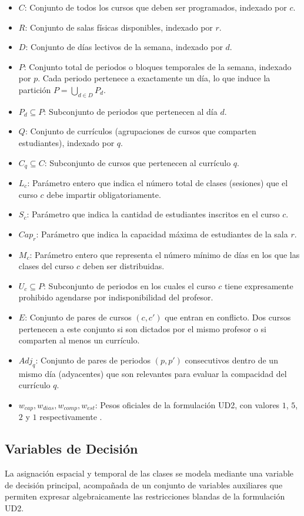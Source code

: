 \documentclass[letter, 10pt]{article}
\begin{document}
\begin{itemize}
    \item $C$: Conjunto de todos los cursos que deben ser programados, indexado por $c$.
    \item $R$: Conjunto de salas físicas disponibles, indexado por $r$.
    \item $D$: Conjunto de días lectivos de la semana, indexado por $d$.
    \item $P$: Conjunto total de periodos o bloques temporales de la semana, indexado por $p$. Cada periodo pertenece a exactamente un día, lo que induce la partición $P = \bigcup_{d \in D} P_d$.
    \item $P_d \subseteq P$: Subconjunto de periodos que pertenecen al día $d$.
    \item $Q$: Conjunto de currículos (agrupaciones de cursos que comparten estudiantes), indexado por $q$.
    \item $C_q \subseteq C$: Subconjunto de cursos que pertenecen al currículo $q$.
    \item $L_c$: Parámetro entero que indica el número total de clases (sesiones) que el curso $c$ debe impartir obligatoriamente.
    \item $S_c$: Parámetro que indica la cantidad de estudiantes inscritos en el curso $c$.
    \item $Cap_r$: Parámetro que indica la capacidad máxima de estudiantes de la sala $r$.
    \item $M_c$: Parámetro entero que representa el número mínimo de días en los que las clases del curso $c$ deben ser distribuidas.
    \item $U_c \subseteq P$: Subconjunto de periodos en los cuales el curso $c$ tiene expresamente prohibido agendarse por indisponibilidad del profesor.
    \item $E$: Conjunto de pares de cursos $(c, c')$ que entran en conflicto. Dos cursos pertenecen a este conjunto si son dictados por el mismo profesor o si comparten al menos un currículo.
    \item $Adj_q$: Conjunto de pares de periodos $(p, p')$ consecutivos dentro de un mismo día (adyacentes) que son relevantes para evaluar la compacidad del currículo $q$.
    \item $w_{cap}, w_{dias}, w_{comp}, w_{est}$: Pesos oficiales de la formulación UD2, con valores $1$, $5$, $2$ y $1$ respectivamente \cite{digaspero2007}.
\end{itemize}

\subsection{Variables de Decisión}
La asignación espacial y temporal de las clases se modela mediante una variable de decisión principal, acompañada de un conjunto de variables auxiliares que permiten expresar algebraicamente las restricciones blandas de la formulación UD2.
\end{document}

